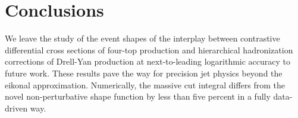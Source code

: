 \section{Conclusions}\label{sec:conclusions}

We leave the study of the event shapes of the interplay between
contrastive differential cross sections of four-top production and
hierarchical hadronization corrections of Drell-Yan production at
next-to-leading logarithmic accuracy to future work. These results pave
the way for precision jet physics beyond the eikonal approximation.
Numerically, the massive cut integral differs from the novel
non-perturbative shape function by less than five percent in a fully
data-driven way.

